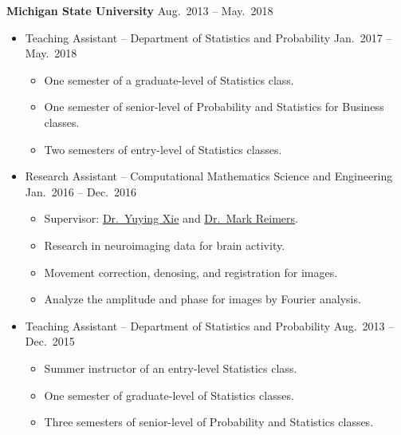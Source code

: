 \documentclass[a4paper,10pt,dvipdfmx]{article}
\begin{document}
\textbf{Michigan State University} \hfill Aug.~2013 -- May.~2018
\begin{itemize}[noitemsep,nolistsep]
  \item[] Teaching Assistant -- Department of Statistics and Probability \hfill Jan.~2017 -- May.~2018
    \begin{itemize}[noitemsep,nolistsep]
      \item One semester of a graduate-level of Statistics class.
      \item One semester of senior-level of Probability and Statistics for Business classes.
      \item Two semesters of entry-level of Statistics classes.
    \end{itemize}
  \item[] Research Assistant -- Computational Mathematics Science and Engineering \hfill Jan.~2016 -- Dec.~2016
    \begin{itemize}[noitemsep,nolistsep]
      \item[] \hspace{-3ex} Supervisor: \href{https://cmse.msu.edu/directory/faculty/yuying-xie/}{Dr.~Yuying Xie} and \href{https://msu.edu/~reimersm/}{Dr.~Mark Reimers}.
      \item Research in neuroimaging data for brain activity.
      \item Movement correction, denosing, and registration for images.
      \item Analyze the amplitude and phase for images by Fourier analysis.
    \end{itemize}
  \item[] Teaching Assistant -- Department of Statistics and Probability \hfill Aug.~2013 -- Dec.~2015
    \begin{itemize}[noitemsep,nolistsep]
      \item Summer instructor of an entry-level Statistics class.
      \item One semester of graduate-level of Statistics classes.
      \item Three semesters of senior-level of Probability and Statistics classes.\\
    \end{itemize}
\end{itemize}
\end{document}
